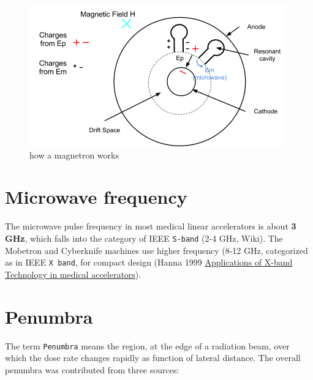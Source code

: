 \documentclass[]{book}
\theoremstyle{definition}
\theoremstyle{definition}
\theoremstyle{definition}
\theoremstyle{remark}
\begin{document}
\begin{figure}

{\centering \includegraphics{figures/magnetron} 

}

\caption{how a magnetron works}\label{fig:unnamed-chunk-7}
\end{figure}

\section{Microwave frequency}\label{microwave-frequency}

The microwave pulse frequency in most medical linear accelerators is
about \textbf{3 GHz}, which falls into the category of IEEE
\texttt{S-band} (2-4 GHz, Wiki). The Mobetron and Cyberknife machines
use higher frequency (8-12 GHz, categorized as in IEEE \texttt{X\ band},
for compact design (Hanna 1999
\href{https://accelconf.web.cern.ch/AccelConf/p99/PAPERS/WEP114.PDF}{Applications
of X-band Technology in medical accelerators}).

\section{Penumbra}\label{penumbra}

The term \texttt{Penumbra} means the region, at the edge of a radiation
beam, over which the dose rate changes rapidly as function of lateral
distance. The overall penumbra was contributed from three sources:
\end{document}
